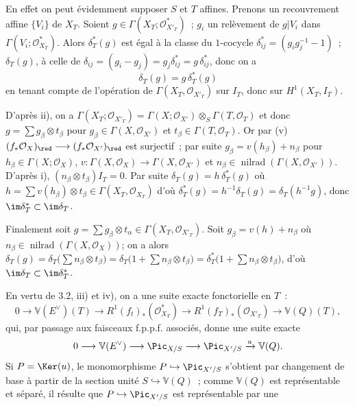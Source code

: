 En
effet on peut évidemment supposer \(S\) et \(T\) affines. Prenons un recouvrement affine \(\{V_i\}\) de \(X_T\). Soient \(g\in\Gamma(X_T;\mathcal O_{X'_T}^{*})\)~; \(g_i\) un relèvement de \(g|V_i\) dans \(\Gamma(V_i;\mathcal O_{X_T}^{*})\). Alors \(\delta_T^*(g)\) est égal à la classe du \(1\)-cocycle \(\delta_{ij}^*=(g_ig_j^{-1}-1)\)~; \(\delta_T(g)\), à celle de \(\delta_{ij}=(g_i-g_j)=g_j\delta_{ij}^*=g\,\delta_{ij}^*\), donc on a
\[
  \delta_T(g)=g\,\delta_T^*(g)
\]
en tenant compte de l'opération de \(\Gamma(X_T,\mathcal O_{X'_T})\) sur \(I_T\), donc sur \(H^1(X_T,I_T)\).

D'après ii), on a \(\Gamma(X_T;\mathcal O_{X'_T})=\Gamma(X;\mathcal O_{X'})\otimes_S\Gamma(T,\mathcal O_T)\) et donc \(g=\sum g_\beta\otimes t_\beta\) pour
\(g_\beta\in\Gamma(X,\mathcal O_{X'})\) et
\(t_\beta\in\Gamma(T,\mathcal O_T)\). Or par (v) \((f_*\mathcal O_X)_{\red}\longrightarrow(f_*\mathcal O_{X'})_{\red}\) est surjectif~; par suite \(g_\beta=v(h_\beta)+n_\beta\) pour
\(h_\beta\in\Gamma(X;\mathcal O_X)\), \(v:\Gamma(X,\mathcal O_X)\to
\Gamma(X,\mathcal O_{X'})\) et
\(n_\beta\in\operatorname{nilrad}(\Gamma(X,\mathcal O_{X'}))\). D'après i),
\((n_\beta\otimes t_\beta)I_T=0\). Par suite \(\delta_T(g)=h\,\delta_T^*(g)\) où \(h=\sum v(h_\beta)\otimes t_\beta\in\Gamma(X_T,\mathcal O_{X_T})\) d'où \(\delta_T^*(g)=h^{-1}\delta_T(g)=\delta_T(h^{-1}g)\), donc \(\im\delta_T^*\subset\im\delta_T\).

Finalement soit \(g=\sum g_\beta\otimes t_\alpha\in
\Gamma(X_T,\mathcal O_{X'_T})\). Soit \(g_\beta=v(h)+n_\beta\) où
\(n_\beta\in\operatorname{nilrad}(\Gamma(X,\mathcal O_X))\); on a alors \(\delta_T(g)=\delta_T\bigl(\sum n_\beta\otimes t_\beta\bigr)=\delta_T\bigl(1+\sum n_\beta\otimes t_\beta\bigr)=\delta_T^*\bigl(1+\sum n_\beta\otimes t_\beta\bigr)\), d'où \(\im\delta_T\subset\im\delta_T^*\).

En vertu de 3.2, iii) et iv), on a une suite exacte fonctorielle en \(T\)~:
\[
  0\longrightarrow \mathbb V(E^\vee)(T)\longrightarrow
  R^1(f_t)_*(\mathcal O_{X_T}^{*})
  \longrightarrow
  R^1(f_T)_*(\mathcal O_{X'_T})
  \longrightarrow
  \mathbb V(Q)(T),
\]
qui, par passage aux faisceaux f.p.p.f. associés, donne une suite exacte
\[
  0\longrightarrow \mathbb V(E^\vee)\longrightarrow\Pic_{X/S}
  \longrightarrow\Pic_{X'/S}\xrightarrow{u}\mathbb V(Q).
\]
Si \(P=\Ker(u)\), le monomorphisme \(P\hookrightarrow\Pic_{X'/S}\) s'obtient par changement de base à partir de la section unité \(S\hookrightarrow\mathbb V(Q)\)~; comme \(\mathbb V(Q)\) est représentable et séparé, il résulte que \(P\hookrightarrow\Pic_{X'/S}\) est représentable par une
